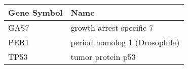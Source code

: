 \begin{tabular}{ll}
\toprule
Gene Symbol &                          Name \\
\midrule
       GAS7 &      growth arrest-specific 7 \\
       PER1 & period homolog 1 (Drosophila) \\
       TP53 &             tumor protein p53 \\
\bottomrule
\end{tabular}
